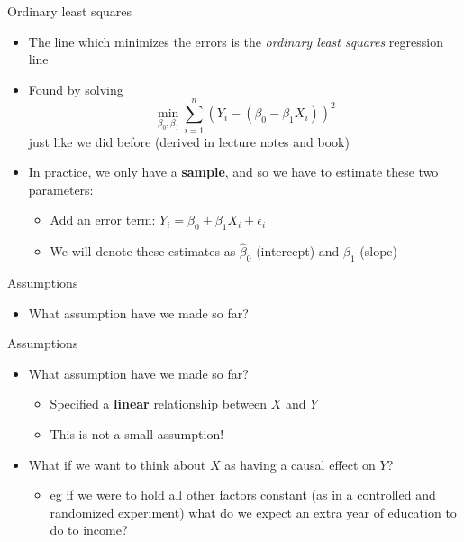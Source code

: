 \documentclass[aspectratio=169]{beamer}
\begin{document}
\begin{frame}{Ordinary least squares}
    \begin{itemize}
        \item The line which minimizes the errors is the \textit{ordinary least squares} regression line
        \item Found by solving 
        $$
        \min_{\beta_0, \beta_1} \sum_{i=1}^n (Y_i - (\beta_0 - \beta_1 X_i))^2
        $$
        just like we did before (derived in lecture notes and book)
        \item In practice, we only have a \textbf{sample}, and so we have to estimate these two parameters:
        \begin{itemize}
            \item Add an error term: $Y_i = \beta_0 + \beta_1 X_i + \epsilon_i$
            \item We will denote these estimates as $\hat{\beta}_0$ (intercept) and $\hat{\beta}_1$ (slope)
        \end{itemize}
    \end{itemize}
\end{frame}

\begin{frame}{Assumptions}
    \begin{itemize}
        \item What assumption have we made so far?
    \end{itemize}
\end{frame}

\begin{frame}{Assumptions}
    \begin{itemize}
        \item What assumption have we made so far?
        \begin{itemize}
            \item Specified a \textbf{linear} relationship between $X$ and $Y$
            \item This is not a small assumption!
        \end{itemize}
        \item What if we want to think about $X$ as having a causal effect on $Y$?
        \begin{itemize}
            \item eg if we were to hold all other factors constant (as in a controlled and randomized experiment) what do we expect an extra year of education to do to income?
        \end{itemize}
    \end{itemize}
\end{frame}
\end{document}
